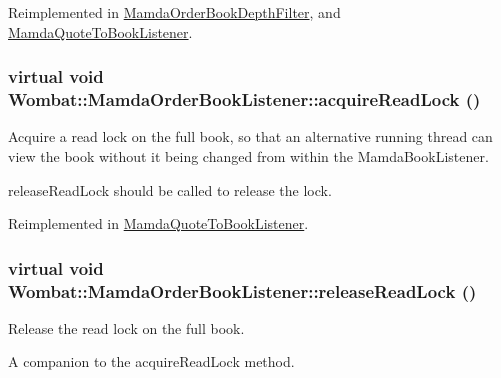 Reimplemented in \hyperlink{classMamdaOrderBookDepthFilter_0d514d92284c0fefa84201aae411111d}{Mamda\-Order\-Book\-Depth\-Filter}, and \hyperlink{classMamdaQuoteToBookListener_2d57ca85affe2614497a207122ae6193}{Mamda\-Quote\-To\-Book\-Listener}.\hypertarget{classWombat_1_1MamdaOrderBookListener_c049e9bab85f8db59adafeddee15e23e}{
\subsubsection[acquireReadLock]{\setlength{\rightskip}{0pt plus 5cm}virtual void Wombat::Mamda\-Order\-Book\-Listener::acquire\-Read\-Lock ()}}
\label{classWombat_1_1MamdaOrderBookListener_c049e9bab85f8db59adafeddee15e23e}


Acquire a read lock on the full book, so that an alternative running thread can view the book without it being changed from within the Mamda\-Book\-Listener. 

release\-Read\-Lock should be called to release the lock. 

Reimplemented in \hyperlink{classMamdaQuoteToBookListener_b3aaeea876237a3869a4380c6d12c409}{Mamda\-Quote\-To\-Book\-Listener}.\hypertarget{classWombat_1_1MamdaOrderBookListener_c227fabc3c91c6dbef8a6e338a023858}{
\subsubsection[releaseReadLock]{\setlength{\rightskip}{0pt plus 5cm}virtual void Wombat::Mamda\-Order\-Book\-Listener::release\-Read\-Lock ()}}
\label{classWombat_1_1MamdaOrderBookListener_c227fabc3c91c6dbef8a6e338a023858}


Release the read lock on the full book. 

A companion to the acquire\-Read\-Lock method. 

